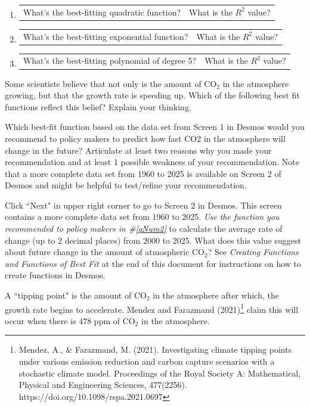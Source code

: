 \documentclass[11pt]{article}
\begin{document}
{\begin{enumerate}
\item \begin{tabular}{p{4in} l} What's the best-fitting quadratic function? & What is the $R^2$ value?\end{tabular}
\item \begin{tabular}{p{4in} l} What's the best-fitting exponential function? & What is the $R^2$ value?\end{tabular}
\item\begin{tabular}{p{4in} l} What's the best-fitting polynomial of degree 5? & What is the $R^2$ value?\end{tabular}
\end{enumerate} 
 \item Some scientists believe that not only is the amount of CO$_2$ in the atmosphere growing, but that the growth rate is speeding up.  Which of the following best fit functions reflect this belief? Explain your thinking.
 \newpage
\item   Which best-fit function based on the data set from Screen 1 in Desmos would you recommend to policy makers to predict how fast CO2 in the atmosphere will change in the future?  Articulate at least two reasons why you made your recommendation and at least 1 possible weakness of your recommendation. Note that a more complete data set from 1960 to 2025 is available on Screen 2 of Desmos and might be helpful to test/refine your recommendation. \label{qNum2}
\item Click ``Next" in upper right corner to go to Screen 2 in Desmos.  This screen  contains a more complete data set from 1960 to 2025.   {\em Use the function you recommended to policy makers in \#\ref{qNum2}} to calculate the average rate of change (up to $2$ decimal places) from 2000 to 2025.  What does this value suggest about future change in the amount of atmospheric CO$_2$? See {\em Creating Functions and Functions of Best Fit} at the end of this document for instructions on how to create functions in Desmos.
\newpage
 \item A ``tipping point" is the amount of CO$_2$ in the atmosphere after which, the growth rate begins to accelerate.  Mendez and Farazmand (2021)\footnote{Mendez, A., \& Farazmand, M. (2021). Investigating climate tipping points under various emission reduction and carbon capture scenarios with a stochastic climate model. Proceedings of the Royal Society A: Mathematical, Physical and Engineering Sciences, 477(2256). https://doi.org/10.1098/rspa.2021.0697} claim this will occur when there is $478$ ppm of CO$_2$ in the atmosphere. 
\vfill

}

  \newpage

\end{document}
